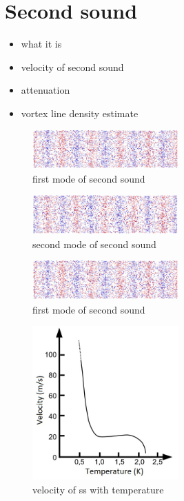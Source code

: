 \section{Second sound}
\begin{itemize}
	\item what it is
	\item velocity of second sound
	\item attenuation
	\item vortex line density estimate
\end{itemize}

\begin{figure}[h]
	\centering
	\includegraphics[width=0.5\textwidth]{graphics/theory/ss_1}
	\caption{first mode of second sound}
	\label{ss_1}
\end{figure}

\begin{figure}[h]
	\centering
	\includegraphics[width=0.5\textwidth]{graphics/theory/ss_2}
	\caption{second mode of second sound}
	\label{ss_2}
\end{figure}

\begin{figure}[h]
	\centering
	\includegraphics[width=0.5\textwidth]{graphics/theory/ss_1}
	\caption{first mode of second sound}
	\label{ss_1}
\end{figure}

\begin{figure}[h]
	\centering
	\includegraphics[width=0.5\textwidth]{graphics/theory/ss_velocity}
	\caption{velocity of ss with temperature}
	\label{ss_velocity}
\end{figure}


\newpage
